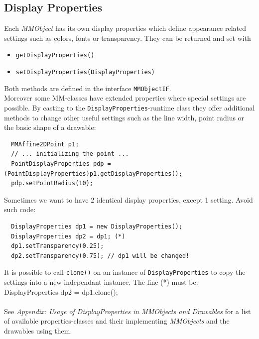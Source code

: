 \documentclass[a4paper,12pt]{book}
\newcommand{\mmo}{\emph{MMObject }}
\newcommand{\mmos}{\emph{MMObjects }}
\begin{document}
  \subsection{Display Properties}
  Each \mmo has its own display properties which define appearance related settings such as colors,
  fonts or transparency. They can be returned and set with
  \begin{itemize}
    \item \verb|getDisplayProperties()|
    \item \verb|setDisplayProperties(DisplayProperties)|
  \end{itemize}
  Both methods are defined in the interface \verb|MMObjectIF|.\\
  Moreover some MM-classes have extended properties where special settings are
  possible. By casting to the \verb|DisplayProperties|-runtime class they offer additional methods to
  change other useful settings such as the line width, point radius or the basic shape of a drawable:\\
  \begin{footnotesize}
  \begin{verbatim}
  MMAffine2DPoint p1;
  // ... initializing the point ...
  PointDisplayProperties pdp = (PointDisplayProperties)p1.getDisplayProperties();
  pdp.setPointRadius(10);
  \end{verbatim}
  \end{footnotesize}
  Sometimes we want to have 2 identical display properties, except 1 setting. Avoid such code:\\
  \begin{footnotesize}
  \begin{verbatim}
  DisplayProperties dp1 = new DisplayProperties();
  DisplayProperties dp2 = dp1; (*)
  dp1.setTransparency(0.25);
  dp2.setTransparency(0.75); // dp1 will be changed!
  \end{verbatim}
  \end{footnotesize}
  It is possible to call \verb|clone()| on an instance of \verb|DisplayProperties| to copy the settings
  into a new independant instance. The line (*) must be:\\
  {\small\ttfamily
    DisplayProperties dp2 = dp1.clone();\\
  }
  \\See \small{\textit{Appendix: Usage of DisplayProperties in \mmos and Drawables}}
  for a list of available properties-classes and their implementing \mmos and 
  the drawables using them.  
  
\end{document}
